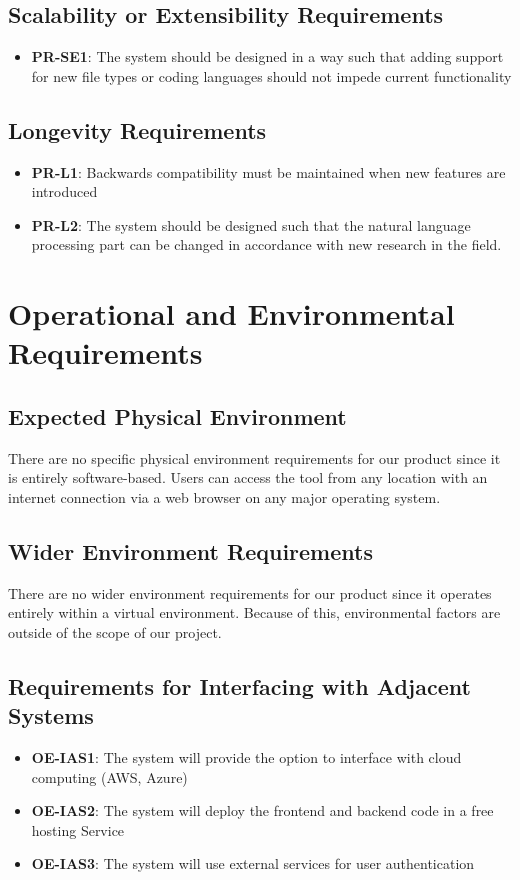 \documentclass[12pt]{article}
\begin{document}
\subsection{Scalability or Extensibility Requirements}
\begin{itemize}
    \item \textbf{PR-SE1}: The system should be designed in a way such that adding support for new file types or coding languages should not impede current functionality
\end{itemize}
\subsection{Longevity Requirements}
\begin{itemize}
    \item \textbf{PR-L1}: Backwards compatibility must be maintained when new features are introduced
    \item \textbf{PR-L2}: The system should be designed such that the natural language processing part can be changed in accordance with new research in the field.
\end{itemize}

\section{Operational and Environmental Requirements}
\subsection{Expected Physical Environment}
There are no specific physical environment requirements for our product since it is entirely software-based.
Users can access the tool from any location with an internet connection via a web browser on any major operating system.

\subsection{Wider Environment Requirements}
There are no wider environment requirements for our product since it operates entirely within a virtual environment.
Because of this, environmental factors are outside of the scope of our project.

\subsection{Requirements for Interfacing with Adjacent Systems}
\begin{itemize}
    \item \textbf{OE-IAS1}: The system will provide the option to interface with cloud computing (AWS, Azure) 
    \item \textbf{OE-IAS2}: The system will deploy the frontend and backend code in a free hosting Service
    \item \textbf{OE-IAS3}: The system will use external services for user authentication 
\end{itemize}
\end{document}
